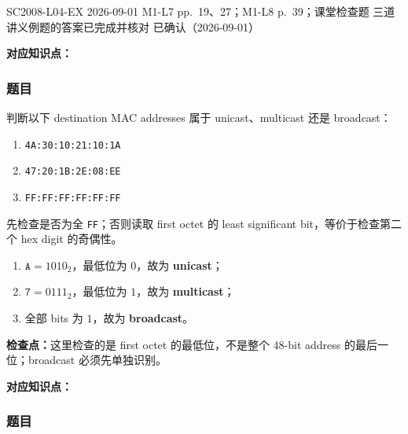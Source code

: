 

\examplemeta
  {SC2008-L04-EX}
  {2026-09-01}
  {M1-L7 pp.~19、27；M1-L8 p.~39；课堂检查题}
  {三道讲义例题的答案已完成并核对}
  {已确认（2026-09-01）}


\textbf{对应知识点：}

\subsubsection*{题目}

判断以下 destination MAC addresses 属于 unicast、multicast 还是 broadcast：
\begin{enumerate}[label=(\alph*)]
  \item \texttt{4A:30:10:21:10:1A}
  \item \texttt{47:20:1B:2E:08:EE}
  \item \texttt{FF:FF:FF:FF:FF:FF}
\end{enumerate}

\begin{checkedsolution}
先检查是否为全 \texttt{FF}；否则读取 first octet 的 least significant bit，等价于检查第二个 hex digit 的奇偶性。
\begin{enumerate}[label=(\alph*)]
  \item $\texttt{A}=1010_2$，最低位为 $0$，故为 \textbf{unicast}；
  \item $\texttt{7}=0111_2$，最低位为 $1$，故为 \textbf{multicast}；
  \item 全部 bits 为 $1$，故为 \textbf{broadcast}。
\end{enumerate}
\end{checkedsolution}

\textbf{检查点：}这里检查的是 first octet 的最低位，不是整个 48-bit address 的最后一位；broadcast 必须先单独识别。


\textbf{对应知识点：}

\subsubsection*{题目}

